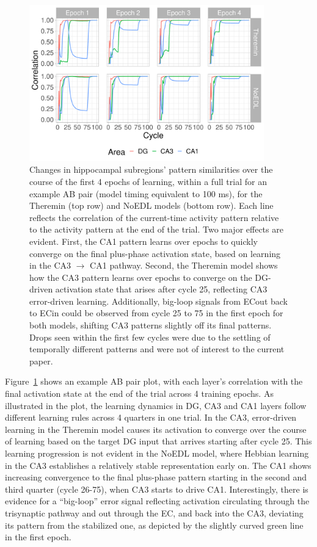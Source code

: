 \documentclass[11pt,twoside]{article}
\newif\myifpdf
\begin{document}
\begin{figure}
  \centering\includegraphics[width=4in]{fig_hip_edl_pat_sim}
  \caption{\footnotesize Changes in hippocampal subregions' pattern similarities over the course of the first 4 epochs of learning, within a full trial for an example AB pair (model timing equivalent to 100 ms), for the Theremin (top row) and NoEDL models (bottom row).  Each line reflects the correlation of the current-time activity pattern relative to the activity pattern at the end of the trial.  Two major effects are evident.  First, the CA1 pattern learns over epochs to quickly converge on the final plus-phase activation state, based on learning in the CA3 $\rightarrow$ CA1 pathway.  Second, the Theremin model shows how the CA3 pattern learns over epochs to converge on the DG-driven activation state that arises after cycle 25, reflecting CA3 error-driven learning.  Additionally, big-loop signals from ECout back to ECin could be observed from cycle 25 to 75 in the first epoch for both models, shifting CA3 patterns slightly off its final patterns.  Drops seen within the first few cycles were due to the settling of temporally different patterns and were not of interest to the current paper.}
\label{fig.pat_sim}
\end{figure}

Figure~\ref{fig.pat_sim} shows an example AB pair plot, with each layer's correlation with the final activation state at the end of the trial across 4 training epochs.  As illustrated in the plot, the learning dynamics in DG, CA3 and CA1 layers follow different learning rules across 4 quarters in one trial.  In the CA3, error-driven learning in the Theremin model causes its activation to converge over the course of learning based on the target DG input that arrives starting after cycle 25.  This learning progression is not evident in the NoEDL model, where Hebbian learning in the CA3 establishes a relatively stable representation early on.  The CA1 shows increasing convergence to the final plus-phase pattern starting in the second and third quarter (cycle 26-75), when CA3 starts to drive CA1.  Interestingly, there is evidence for a ``big-loop'' error signal \citep{KumaranMcClelland12} reflecting activation circulating through the trisynaptic pathway and out through the EC, and back into the  CA3, deviating its pattern from the stabilized one, as depicted by the slightly curved green line in the first epoch.
\end{document}
